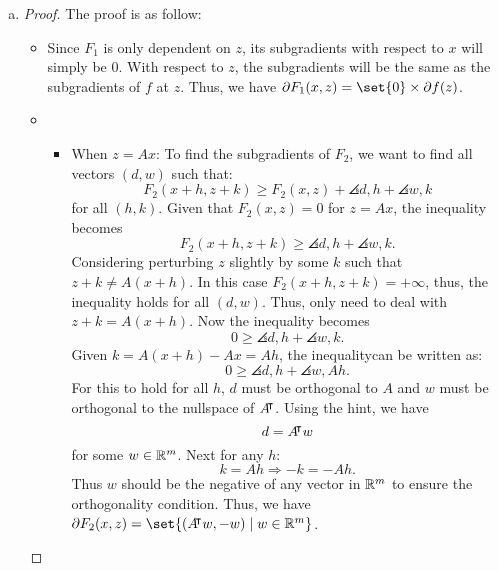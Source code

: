 \documentclass{article}
\begin{document}
\begin{solution}
\begin{enumerate}[(a)]
{\begin{proof}
\begin{itemize}
                    \item \textbf{\( F \) is convex:}
                    \( F \) is the sum of \( F_1 \) and \( F_2 \), and the sum of two convex functions is also convex.

                    \item \textbf{\( d \in \partial g(x) \) implies \( (d, 0) \in \partial F(x, Ax) \):}
                    By the definition of subgradients and function \( g \), we have:
                    \[ g(x+h) \geq g(x) + d^\top h \text{ for all } h \in \mathbb{R}^n. \]
                    Given \( g(x) = f(Ax) \), this can be rewritten as:
                    \[ f(A(x+h)) \geq f(Ax) + d^\top h. \]
                    Considering the definition of \( F \), we can express this inequality as:
                    \[ F(x+h, A(x+h)) \geq F(x, Ax) + d^\top h. \]
                    Given the definition of the subgradients for functions of two variables, this means:
                    \[ (d, 0) \in \partial F(x, Ax) \]
                \end{itemize}
            \end{proof}
        }
        \item {
            \begin{proof}
                The proof is as follow:
                \begin{itemize}
                    \item Since $F_1$ is only dependent on $z$, its subgradients with respect to $x$ will simply be $0$. With respect to $z$, the subgradients will be the same as the subgradients of $f$ at $z$. Thus, we have $\partial F_1(x,z)=\set{0}\times\partial f(z)$.
                    \item {
                        \begin{itemize}
                            \item When $z=Ax$: To find the subgradients of $F_2$, we want to find all vectors $(d,w)$ such that: \[F_2(x+h,z+k)\geq F_2(x,z)+\angles{d,h}+\angles{w,k}\] for all $(h,k)$. Given that $F_2(x,z)=0$ for $z=Ax$, the inequality becomes \[F_2(x+h,z+k)\geq \angles{d,h}+\angles{w,k}.\] Considering perturbing $z$ slightly by some $k$ such that $z+k\neq A(x+h)$. In this case $F_2(x+h,z+k)=+\infty$, thus, the inequality holds for all $(d,w)$. Thus, only need to deal with $z+k = A(x+h)$. Now the inequality becomes \[0\geq \angles{d,h}+\angles{w,k}.\] Given $k=A(x+h)-Ax=Ah$, the inequalitycan be written as: \[0\geq \angles{d,h}+\angles{w,Ah}.\] For this to hold for all $h$, $d$ must be orthogonal to $A$ and $w$ must be orthogonal to the nullspace of $A{}^{\mkern-4mu\intercal}$. Using the hint, we have \[d=A{}^{\mkern-4mu\intercal} w\] for some $w\in\mathbb{R}^m$. Next for any $h$: \[k=Ah\Rightarrow -k=-Ah.\] Thus $w$ should be the negative of any vector in $\mathbb{R}^m$ to ensure the orthogonality condition. Thus, we have $\partial F_2(x,z)=\set{(A\trn w,-w)\mid w\in\R^m}$.

\end{itemize}}
\end{itemize}
\end{proof}}
\end{enumerate}
\end{solution}
\end{document}
